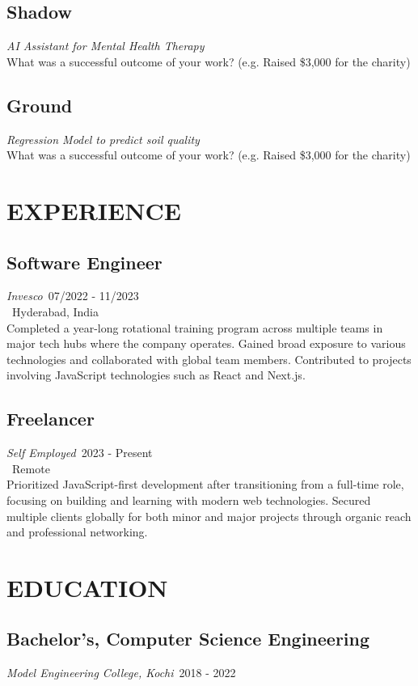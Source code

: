 \documentclass[11pt,a4paper]{article}
\begin{document}
\subsection{Shadow}
\textit{AI Assistant for Mental Health Therapy}\\[0.2cm]
What was a successful outcome of your work? (e.g. Raised \$3,000 for the charity)

\subsection{Ground}
\textit{Regression Model to predict soil quality}\\[0.2cm]
What was a successful outcome of your work? (e.g. Raised \$3,000 for the charity)

\section{EXPERIENCE}

\subsection{Software Engineer}
\textit{Invesco}\hfill \faCalendar\ 07/2022 - 11/2023\\
\faMapMarker\ Hyderabad, India\\[0.2cm]
Completed a year-long rotational training program across multiple teams in major tech hubs where the company operates. Gained broad exposure to various technologies and collaborated with global team members. Contributed to projects involving JavaScript technologies such as React and Next.js.

\subsection{Freelancer}
\textit{Self Employed}\hfill \faCalendar\ 2023 - Present\\
\faMapMarker\ Remote\\[0.2cm]
Prioritized JavaScript-first development after transitioning from a full-time role, focusing on building and learning with modern web technologies. Secured multiple clients globally for both minor and major projects through organic reach and professional networking.

\section{EDUCATION}

\subsection{Bachelor's, Computer Science Engineering}
\textit{Model Engineering College, Kochi}\hfill \faCalendar\ 2018 - 2022
\end{document}
